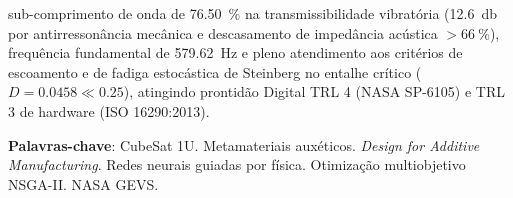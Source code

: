 \begin{resumo}
sub-comprimento de onda de \SI{76.50}{\percent} na transmissibilidade vibratória (\SI{12.6}{\decibel} por antirressonância mecânica e descasamento de impedância acústica $> \SI{66}{\percent}$), frequência fundamental de \SI{579.62}{\hertz} e pleno atendimento aos critérios de escoamento e de fadiga estocástica de Steinberg no entalhe crítico ($D = \num{0.0458} \ll \num{0.25}$), atingindo prontidão Digital TRL 4 (NASA SP-6105) e TRL 3 de hardware (ISO 16290:2013).

\vspace{\onelineskip}
\noindent
\textbf{Palavras-chave}: CubeSat 1U. Metamateriais auxéticos. \textit{Design for Additive Manufacturing}. Redes neurais guiadas por física. Otimização multiobjetivo NSGA-II. NASA GEVS.
\end{resumo}
